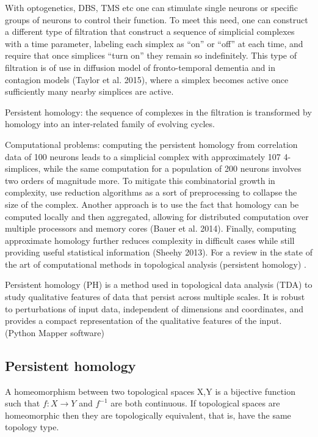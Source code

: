 \documentclass[onecollarge,runningheads]{svjour2}
\begin{document}
With optogenetics, DBS, TMS etc one can stimulate single neurons or specific groups of neurons to control their function. To meet this need, one can construct a different type of filtration \cite{taylor2015topological} that construct a sequence of simplicial complexes with a time parameter, labeling each simplex as “on” or “off” at each time, and require that once simplices “turn on” they remain so indefinitely. This type of filtration is of use in  diffusion model of fronto-temporal dementia and in contagion models (Taylor et al. 2015), where a simplex becomes active once sufficiently many nearby simplices are active.

Persistent homology:  the sequence of complexes in the filtration is transformed by homology into an inter-related family of evolving cycles.

Computational problems: computing the persistent homology from correlation data of 100 neurons leads to a simplicial complex with approximately 107 4-simplices, while the same computation for a population of 200 neurons involves two orders of magnitude more.
To mitigate this combinatorial growth in complexity, use reduction algorithms as a sort of preprocessing to collapse the size of the complex.
Another approach is to use the fact that homology can be computed locally and then aggregated, allowing for distributed computation over multiple processors and memory cores (Bauer et al. 2014). Finally, computing approximate homology further reduces complexity in difficult cases while still providing useful statistical information (Sheehy 2013). 
For a review in the state of the art of computational methods in topological analysis (persistent homology) \cite{otter2015roadmap}.

Persistent homology (PH) is a method used in topological data analysis (TDA) to study qualitative features of data that persist across multiple scales. It is robust to perturbations of input data, independent of dimensions and coordinates, and provides a compact representation of the qualitative features of the input. (Python Mapper software) 


\subsection{Persistent homology}
\label{sec:1}
A homeomorphism between two topological spaces X,Y is a bijective function such that $f:X \to Y$ and $f^{-1}$ are both continuous. If topological spaces are homeomorphic then they are topologically equivalent, that is, have the same topology type.
\end{document}
